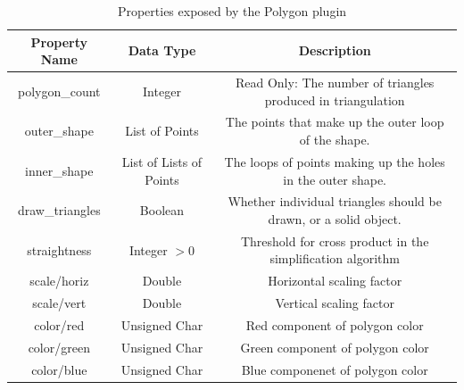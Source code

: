 \begin{itemize}
\begin{table}[h!]
	\centering
	\caption{Properties exposed by the Polygon plugin}
	\label{tab:polygon_props}
	\begin{tabular}{c|c|c}
	Property Name & Data Type & Description\\ \hline \hline
	polygon\_count & Integer & Read Only: The number of triangles produced in triangulation\\ \hline
	outer\_shape & List of Points & The points that make up the outer loop of the shape.\\ \hline
	inner\_shape & List of Lists of Points & The loops of points making up the holes in the outer shape.\\ \hline
	draw\_triangles & Boolean & Whether individual triangles should be drawn, or a solid object.\\ \hline
	straightness & Integer $ > 0 $ & Threshold for cross product in the simplification algorithm\\ \hline
	scale/horiz & Double & Horizontal scaling factor\\ \hline
	scale/vert & Double & Vertical scaling factor\\ \hline
	color/red & Unsigned Char & Red component of polygon color\\ \hline
	color/green & Unsigned Char & Green component of polygon color\\ \hline
	color/blue & Unsigned Char & Blue componenet of polygon color
	\end{tabular}
\end{table}


\end{itemize}
